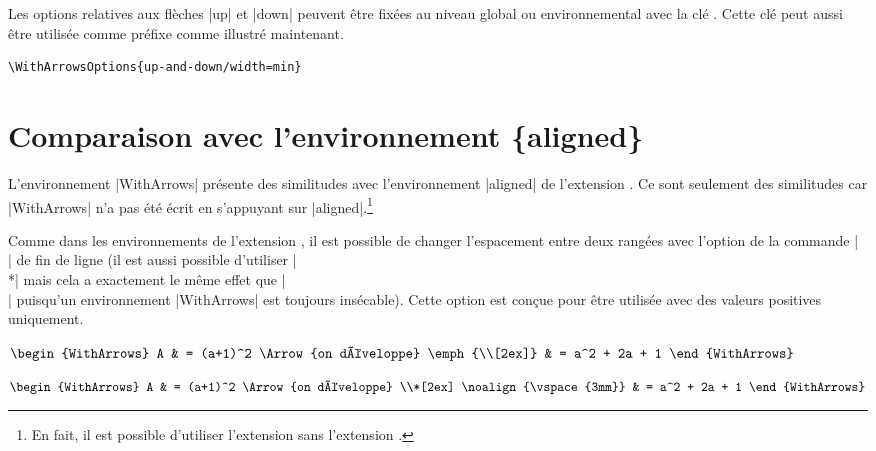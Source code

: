\documentclass[dvipsnames]{article}%
\def\interitem{\vspace{7mm plus 2 mm minus 3mm}}
\begin{document}
\begin{WithArrows}
\begin{WithArrows}[rr]
\vspace{1cm}
Les options relatives aux flèches |up| et |down| peuvent être fixées au niveau global ou
environnemental avec la clé . Cette clé peut aussi être utilisée
comme préfixe comme illustré maintenant.
%
\begin{Verbatim}
\WithArrowsOptions{up-and-down/width=min}
\end{Verbatim}

\interitem

\section{Comparaison avec l'environnement \{aligned\}}

L'environnement |{WithArrows}| présente des similitudes avec l'environnement |{aligned}|
de l'extension . Ce sont seulement des similitudes car |{WithArrows}| n'a pas
été écrit en s'appuyant sur |{aligned}|.\footnote{En fait, il est possible d'utiliser
  l'extension  sans l'extension .}

\interitem 

Comme dans les environnements de l'extension , il est possible de changer
l'espacement entre deux rangées avec l'option de la commande |\\| de fin de ligne (il est
aussi possible d'utiliser |\\*| mais cela a exactement le même effet que |\\| puisqu'un
environnement |{WithArrows}| est toujours insécable). Cette option est conçue pour être
utilisée avec des valeurs positives uniquement.
%
\begin{Code}
$\begin{WithArrows}
A & = (a+1)^2 \Arrow{on développe} \emph{\\[2ex]}
  & = a^2 + 2a + 1 
\end{WithArrows}$
\end{Code}

$\begin{WithArrows}
A & = (a+1)^2 \Arrow{on développe} \\*[2ex]
\noalign{\vspace{3mm}}
  & = a^2 + 2a + 1 
\end{WithArrows}$



\end{WithArrows}
\end{WithArrows}
\end{document}
